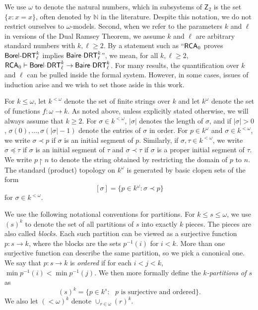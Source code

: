 \documentclass{amsart}
\theoremstyle{definition}
\theoremstyle{remark}
\newcommand{\system}[1]{\mbox{\fontfamily{cmss}\fontshape{n}\fontseries{m}%
    \selectfont#1}}
\newcommand{\RCA}{\system{RCA}\ensuremath{_0}}
\newcommand{\BoDRT}{\system{Borel-DRT}}
\newcommand{\BaDRT}{\system{Baire-DRT}}
\newcommand{\restrict}{\upharpoonright}
\newcommand{\block}[2]{{#1}^{-1}(#2)}
\begin{document}
We use $\omega$ to denote the natural numbers, which in subsystems of $\mathsf{Z}_2$ 
is the set $\{ x : x=x \}$, often 
denoted by $\mathbb{N}$ in the literature. Despite this notation, we do not restrict ourselves to $\omega$-models. Second, when we refer to the parameters $k$ and 
$\ell$ in versions of the Dual Ramsey Theorem, we assume $k$ and $\ell$ are arbitrary standard numbers with $k, \ell \geq 2$. By a statement such as 
``$\RCA$ proves $\BoDRT^k_{\ell}$ implies $\BaDRT^k_{\ell}$'', we mean, for all $k, \ell \geq 2$, $\RCA \vdash \BoDRT^k_{\ell} \rightarrow \BaDRT^k_{\ell}$. 
For many results, the quantification over $k$ and $\ell$ can be pulled inside the formal system. However, in some cases, issues of induction arise and 
we wish to set those aside in this work.



For $k \leq \omega$, let $k^{< \omega}$ denote the set of finite strings over $k$ and let $k^\omega$ denote the set of  functions $f:\omega \rightarrow k$. As noted above, 
unless explicitly stated otherwise, we will always assume that $k \geq 2$. 
For $\sigma \in k^{< \omega}$, $|\sigma|$ denotes the length of $\sigma$, and if $|\sigma| > 0$, $\sigma(0), \ldots, \sigma(|\sigma|-1)$ denote the entries of $\sigma$ in order. 
For $p \in k^{\omega}$ and $\sigma \in k^{< \omega}$, we write $\sigma \prec p$ if $\sigma$ is an initial segment of $p$.  Similarly, if $\sigma, \tau \in
k^{< \omega}$, we write $\sigma \preceq \tau$ if $\sigma$ is an initial segment of $\tau$ and $\sigma \prec \tau$ if $\sigma$ is a
proper initial segment of $\tau$. We write $p \restrict n$ to denote the string obtained by restricting 
the domain of $p$ to $n$. The standard (product) topology on $k^{\omega}$ is generated by basic clopen sets of the form
\[
[\sigma] = \{ p \in k^{\omega} : \sigma \prec p \}
\]
for $\sigma \in k^{< \omega}$. 

We use the following notational conventions for partitions.
For $k \leq s \leq \omega$, we use $(s)^k$ to denote the 
set of all partitions of $s$ into exactly $k$ pieces.
The pieces are also called \emph{blocks}.
Each such partition can be viewed
as a surjective function $p:s\rightarrow k$, where the 
blocks are the sets $\block{p}{i}$ for $i<k$.  More than one 
surjective function can describe the same partition,
so we pick a canonical one.
We say that $p:s\rightarrow k$ 
is \emph{ordered} if for each $i<j<k$, 
$\min \block{p}{i} < \min \block{p}{j}$. 
We then more formally define the \emph{$k$-partitions of $s$} as
$$(s)^k = \{ p \in k^s : \text{ $p$ is surjective and ordered}\}.$$
 We also let $(<\omega)^k$ denote $\cup_{r \in \omega} (r)^k$.
 
\end{document}
